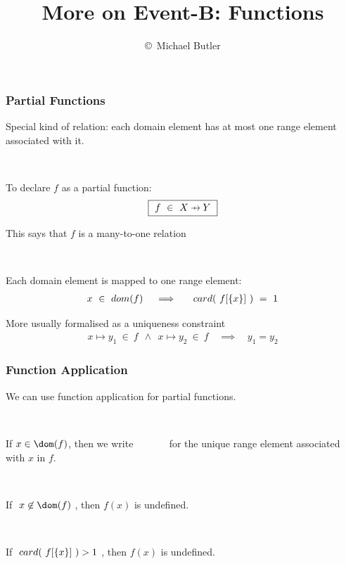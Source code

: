 \documentclass{beamer}
\title{More on Event-B: Functions}
\author{\copyright\ Michael Butler}
\institute{ University of Southampton }
\begin{document}
\begin{frame}

\titlepage

\end{frame}














\begin{frame}

\frametitle{Partial Functions}

Special kind of relation:
each domain element has \alert{at most one range element }associated with
it. 

~

To declare $f$ as a partial function:
\[
     \mbox{\fbox{$~f ~\in~ X\pfun Y~$}}
\]

This says that $f$ is a \alert{many-to-one} relation

~

Each domain element is mapped to  \alert{one} range element:
\begin{eqnarray*}
    x~\in~ dom(f) ~
    &~~\implies~~& card(~f[\{x\}]~) ~=~ 1
\end{eqnarray*}

More usually formalised as a \alert{uniqueness} constraint
\begin{eqnarray*}
    x\mapsto y_{1}~\in~ f ~~\land~~ x\mapsto y_{2}~\in~ f
    &~~\implies~~& y_{1} = y_{2}
\end{eqnarray*}

\end{frame}



\begin{frame}


\frametitle{Function Application}

We can use \alert{function application} for partial functions.

~


If $x\in \dom(f)$, then we write ~~~~~~ for the
\alert{unique} range element associated with $x$ in $f$.

~

If $~x\not\in\dom(f)~$, then $f(x)$ is \alert{undefined}.

~

If $~card(~f[\{x\}]~)>1~$, then $f(x)$ is \alert{undefined}.

\end{frame}
\end{document}
